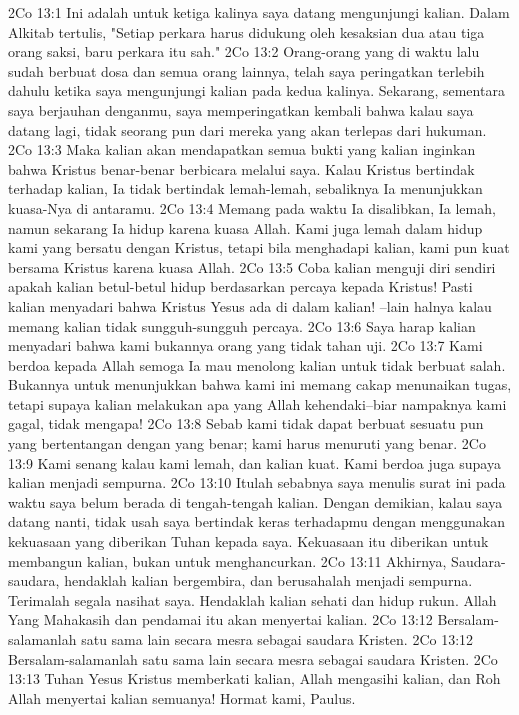 2Co 13:1  Ini adalah untuk ketiga kalinya saya datang mengunjungi kalian. Dalam Alkitab tertulis, "Setiap perkara harus didukung oleh kesaksian dua atau tiga orang saksi, baru perkara itu sah."
2Co 13:2  Orang-orang yang di waktu lalu sudah berbuat dosa dan semua orang lainnya, telah saya peringatkan terlebih dahulu ketika saya mengunjungi kalian pada kedua kalinya. Sekarang, sementara saya berjauhan denganmu, saya memperingatkan kembali bahwa kalau saya datang lagi, tidak seorang pun dari mereka yang akan terlepas dari hukuman.
2Co 13:3  Maka kalian akan mendapatkan semua bukti yang kalian inginkan bahwa Kristus benar-benar berbicara melalui saya. Kalau Kristus bertindak terhadap kalian, Ia tidak bertindak lemah-lemah, sebaliknya Ia menunjukkan kuasa-Nya di antaramu.
2Co 13:4  Memang pada waktu Ia disalibkan, Ia lemah, namun sekarang Ia hidup karena kuasa Allah. Kami juga lemah dalam hidup kami yang bersatu dengan Kristus, tetapi bila menghadapi kalian, kami pun kuat bersama Kristus karena kuasa Allah.
2Co 13:5  Coba kalian menguji diri sendiri apakah kalian betul-betul hidup berdasarkan percaya kepada Kristus! Pasti kalian menyadari bahwa Kristus Yesus ada di dalam kalian! --lain halnya kalau memang kalian tidak sungguh-sungguh percaya.
2Co 13:6  Saya harap kalian menyadari bahwa kami bukannya orang yang tidak tahan uji.
2Co 13:7  Kami berdoa kepada Allah semoga Ia mau menolong kalian untuk tidak berbuat salah. Bukannya untuk menunjukkan bahwa kami ini memang cakap menunaikan tugas, tetapi supaya kalian melakukan apa yang Allah kehendaki--biar nampaknya kami gagal, tidak mengapa!
2Co 13:8  Sebab kami tidak dapat berbuat sesuatu pun yang bertentangan dengan yang benar; kami harus menuruti yang benar.
2Co 13:9  Kami senang kalau kami lemah, dan kalian kuat. Kami berdoa juga supaya kalian menjadi sempurna.
2Co 13:10  Itulah sebabnya saya menulis surat ini pada waktu saya belum berada di tengah-tengah kalian. Dengan demikian, kalau saya datang nanti, tidak usah saya bertindak keras terhadapmu dengan menggunakan kekuasaan yang diberikan Tuhan kepada saya. Kekuasaan itu diberikan untuk membangun kalian, bukan untuk menghancurkan.
2Co 13:11  Akhirnya, Saudara-saudara, hendaklah kalian bergembira, dan berusahalah menjadi sempurna. Terimalah segala nasihat saya. Hendaklah kalian sehati dan hidup rukun. Allah Yang Mahakasih dan pendamai itu akan menyertai kalian.
2Co 13:12  Bersalam-salamanlah satu sama lain secara mesra sebagai saudara Kristen.
2Co 13:12  Bersalam-salamanlah satu sama lain secara mesra sebagai saudara Kristen.
2Co 13:13  Tuhan Yesus Kristus memberkati kalian, Allah mengasihi kalian, dan Roh Allah menyertai kalian semuanya! Hormat kami, Paulus.


